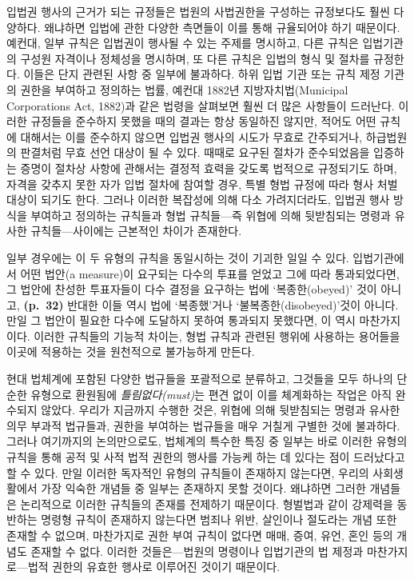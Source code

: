 \documentclass[12pt, oneside]{book}  %
\begin{document}
입법권 행사의 근거가 되는 규정들은 법원의 사법권한을 구성하는 규정보다도
훨씬 다양하다. 왜냐하면 입법에 관한 다양한 측면들이 이를 통해 규율되어야
하기 때문이다. 예컨대, 일부 규칙은 입법권이 행사될 수 있는 주제를
명시하고, 다른 규칙은 입법기관의 구성원 자격이나 정체성을 명시하며, 또
다른 규칙은 입법의 형식 및 절차를 규정한다. 이들은 단지 관련된 사항 중
일부에 불과하다. 하위 입법 기관 또는 규칙 제정 기관의 권한을 부여하고
정의하는 법률, 예컨대 1882년 지방자치법(Municipal Corporations Act,
1882)과 같은 법령을 살펴보면 훨씬 더 많은 사항들이 드러난다. 이러한
규정들을 준수하지 못했을 때의 결과는 항상 동일하진 않지만, 적어도 어떤
규칙에 대해서는 이를 준수하지 않으면 입법권 행사의 시도가 무효로
간주되거나, 하급법원의 판결처럼 무효 선언 대상이 될 수 있다. 때때로
요구된 절차가 준수되었음을 입증하는 증명이 절차상 사항에 관해서는 결정적
효력을 갖도록 법적으로 규정되기도 하며, 자격을 갖추지 못한 자가 입법
절차에 참여할 경우, 특별 형법 규정에 따라 형사 처벌 대상이 되기도 한다.
그러나 이러한 복잡성에 의해 다소 가려지더라도, 입법권 행사 방식을
부여하고 정의하는 규칙들과 형법 규칙들---즉 위협에 의해 뒷받침되는
명령과 유사한 규칙들---사이에는 근본적인 차이가 존재한다.

일부 경우에는 이 두 유형의 규칙을 동일시하는 것이 기괴한 일일 수 있다.
입법기관에서 어떤 법안(a measure)이 요구되는 다수의 투표를 얻었고 그에
따라 통과되었다면, 그 법안에 찬성한 투표자들이 다수 결정을 요구하는 법에
`복종한(obeyed)' 것이 아니고, \textbf{(p.~32)} 반대한 이들 역시 법에
`복종했'거나 `불복종한(disobeyed)'것이 아니다. 만일 그 법안이 필요한
다수에 도달하지 못하여 통과되지 못했다면, 이 역시 마찬가지이다. 이러한
규칙들의 기능적 차이는, 형법 규칙과 관련된 행위에 사용하는 용어들을
이곳에 적용하는 것을 원천적으로 불가능하게 만든다.

현대 법체계에 포함된 다양한 법규들을 포괄적으로 분류하고, 그것들을 모두
하나의 단순한 유형으로 환원됨에 \emph{틀림없다(must)}는 편견 없이 이를
체계화하는 작업은 아직 완수되지 않았다. 우리가 지금까지 수행한 것은,
위협에 의해 뒷받침되는 명령과 유사한 의무 부과적 법규들과, 권한을
부여하는 법규들을 매우 거칠게 구별한 것에 불과하다. 그러나 여기까지의
논의만으로도, 법체계의 특수한 특징 중 일부는 바로 이러한 유형의 규칙을
통해 공적 및 사적 법적 권한의 행사를 가능케 하는 데 있다는 점이
드러났다고 할 수 있다. 만일 이러한 독자적인 유형의 규칙들이 존재하지
않는다면, 우리의 사회생활에서 가장 익숙한 개념들 중 일부는 존재하지 못할
것이다. 왜냐하면 그러한 개념들은 논리적으로 이러한 규칙들의 존재를
전제하기 때문이다. 형벌법과 같이 강제력을 동반하는 명령형 규칙이
존재하지 않는다면 범죄나 위반, 살인이나 절도라는 개념 또한 존재할 수
없으며, 마찬가지로 권한 부여 규칙이 없다면 매매, 증여, 유언, 혼인 등의
개념도 존재할 수 없다. 이러한 것들은---법원의 명령이나 입법기관의 법
제정과 마찬가지로---법적 권한의 유효한 행사로 이루어진 것이기 때문이다.
\end{document}
